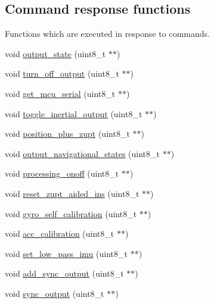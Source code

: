 \subsection*{\-Command response functions}
\label{_amgrpc5b25f46ab968a62146105797e9fb528}%
 \-Functions which are executed in response to commands. \begin{DoxyCompactItemize}
\item 
void \hyperlink{group__control__tables_ga154e99940eadddeab0a978ebaaf4af29}{output\-\_\-state} (uint8\-\_\-t $\ast$$\ast$)
\item 
void \hyperlink{group__control__tables_gaf49fcc59b85d00300cceac3381af50ac}{turn\-\_\-off\-\_\-output} (uint8\-\_\-t $\ast$$\ast$)
\item 
void \hyperlink{group__control__tables_ga144f167d203bfaa934388244862c2e66}{get\-\_\-mcu\-\_\-serial} (uint8\-\_\-t $\ast$$\ast$)
\item 
void \hyperlink{group__control__tables_ga18b9c076238f0421e0c613aba24c1e96}{toggle\-\_\-inertial\-\_\-output} (uint8\-\_\-t $\ast$$\ast$)
\item 
void \hyperlink{group__control__tables_gade63f6b7485456459a562107079a76a8}{position\-\_\-plus\-\_\-zupt} (uint8\-\_\-t $\ast$$\ast$)
\item 
void \hyperlink{group__control__tables_ga73d5a4fdd7dbdf0707007e03b69dd7aa}{output\-\_\-navigational\-\_\-states} (uint8\-\_\-t $\ast$$\ast$)
\item 
void \hyperlink{group__control__tables_ga2f8eeda3ee360ccf29e05fbfda016f47}{processing\-\_\-onoff} (uint8\-\_\-t $\ast$$\ast$)
\item 
void \hyperlink{group__control__tables_gae59981ff1a5486c063329824f812d6ef}{reset\-\_\-zupt\-\_\-aided\-\_\-ins} (uint8\-\_\-t $\ast$$\ast$)
\item 
void \hyperlink{group__control__tables_ga208e711393802848a2f84f913ef3cb84}{gyro\-\_\-self\-\_\-calibration} (uint8\-\_\-t $\ast$$\ast$)
\item 
void \hyperlink{group__control__tables_ga29fdeaec38ab911e7c4a5ffd19dc178d}{acc\-\_\-calibration} (uint8\-\_\-t $\ast$$\ast$)
\item 
void \hyperlink{group__control__tables_ga84aa612912a72fcafffbcccebb850768}{set\-\_\-low\-\_\-pass\-\_\-imu} (uint8\-\_\-t $\ast$$\ast$)
\item 
void \hyperlink{group__control__tables_ga346604881a8eab56c9d83fbc21479aff}{add\-\_\-sync\-\_\-output} (uint8\-\_\-t $\ast$$\ast$)
\item 
void \hyperlink{group__control__tables_gad63b1df6af95332351b359c4765e67fa}{sync\-\_\-output} (uint8\-\_\-t $\ast$$\ast$)
\end{DoxyCompactItemize}
